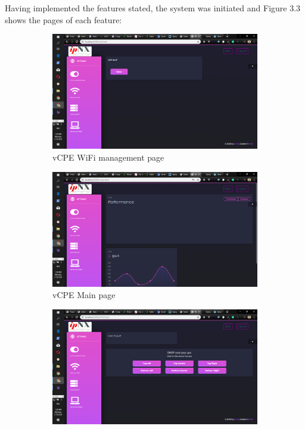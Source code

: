 Having implemented the features stated, the system was initiated and Figure 3.3 shows the pages of each feature:
\begin{figure}[h!]
	\centering
\hfill
\begin{subfigure}[b]{0.45\textwidth}
	\centering
	\includegraphics[width=\textwidth]{./vcpewifi}
	\caption{\ac{vCPE} WiFi management page}
\end{subfigure}
\hfill
\begin{subfigure}[b]{0.45\textwidth}
	\centering
	\includegraphics[width=\textwidth]{./vcpemainpage}
	\caption{\ac{vCPE}  Main page}
\end{subfigure}
\hfill
\begin{subfigure}[b]{0.45\textwidth}
	\centering
	\includegraphics[width=\textwidth]{./vcpedhcp}

\end{subfigure}
\end{figure}
